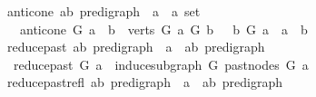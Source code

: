 \begin{isabellebody}
\isamarkupfalse%
\ anticone{\isacharcolon}{\kern0pt}{\isacharcolon}{\kern0pt}\ {\isachardoublequoteopen}{\isacharparenleft}{\kern0pt}{\isacharprime}{\kern0pt}a{\isacharcomma}{\kern0pt}{\isacharprime}{\kern0pt}b{\isacharparenright}{\kern0pt}\ pre{\isacharunderscore}{\kern0pt}digraph\ {\isasymRightarrow}\ {\isacharprime}{\kern0pt}a\ {\isasymRightarrow}\ {\isacharprime}{\kern0pt}a\ set{\isachardoublequoteclose}\isanewline
\ \ \ {\isachardoublequoteopen}anticone\ G\ a\ {\isacharequal}{\kern0pt}\ {\isacharbraceleft}{\kern0pt}b\ {\isasymin}\ verts\ G{\isachardot}{\kern0pt}\ {\isasymnot}{\isacharparenleft}{\kern0pt}a\ {\isasymrightarrow}\isactrlsup {\isacharplus}{\kern0pt}\isactrlbsub G\isactrlesub \ b\ {\isasymor}\ \ b\ {\isasymrightarrow}\isactrlsup {\isacharplus}{\kern0pt}\isactrlbsub G\isactrlesub \ a\ {\isasymor}\ a\ {\isacharequal}{\kern0pt}\ b{\isacharparenright}{\kern0pt}{\isacharbraceright}{\kern0pt}{\isachardoublequoteclose}\ \isanewline
\isanewline
{}\isamarkupfalse%
\ reduce{\isacharunderscore}{\kern0pt}past{\isacharcolon}{\kern0pt}{\isacharcolon}{\kern0pt}\ {\isachardoublequoteopen}{\isacharparenleft}{\kern0pt}{\isacharprime}{\kern0pt}a{\isacharcomma}{\kern0pt}{\isacharprime}{\kern0pt}b{\isacharparenright}{\kern0pt}\ pre{\isacharunderscore}{\kern0pt}digraph\ {\isasymRightarrow}\ {\isacharprime}{\kern0pt}a\ {\isasymRightarrow}\ {\isacharparenleft}{\kern0pt}{\isacharprime}{\kern0pt}a{\isacharcomma}{\kern0pt}{\isacharprime}{\kern0pt}b{\isacharparenright}{\kern0pt}\ pre{\isacharunderscore}{\kern0pt}digraph{\isachardoublequoteclose}\isanewline
\ \ \ \isanewline
\ \ {\isachardoublequoteopen}reduce{\isacharunderscore}{\kern0pt}past\ G\ a\ {\isacharequal}{\kern0pt}\ induce{\isacharunderscore}{\kern0pt}subgraph\ G\ {\isacharparenleft}{\kern0pt}past{\isacharunderscore}{\kern0pt}nodes\ G\ a{\isacharparenright}{\kern0pt}{\isachardoublequoteclose}\isanewline
\isanewline
{}\isamarkupfalse%
\ reduce{\isacharunderscore}{\kern0pt}past{\isacharunderscore}{\kern0pt}refl{\isacharcolon}{\kern0pt}{\isacharcolon}{\kern0pt}\ {\isachardoublequoteopen}{\isacharparenleft}{\kern0pt}{\isacharprime}{\kern0pt}a{\isacharcomma}{\kern0pt}{\isacharprime}{\kern0pt}b{\isacharparenright}{\kern0pt}\ pre{\isacharunderscore}{\kern0pt}digraph\ {\isasymRightarrow}\ {\isacharprime}{\kern0pt}a\ {\isasymRightarrow}\ {\isacharparenleft}{\kern0pt}{\isacharprime}{\kern0pt}a{\isacharcomma}{\kern0pt}{\isacharprime}{\kern0pt}b{\isacharparenright}{\kern0pt}\ pre{\isacharunderscore}{\kern0pt}digraph{\isachardoublequoteclose}\isanewline

\end{isabellebody}

